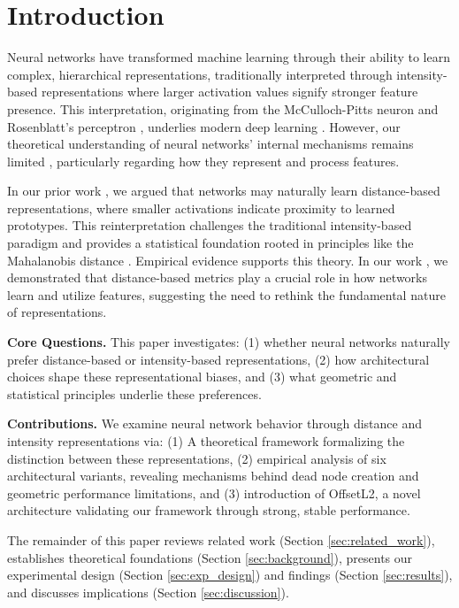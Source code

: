 \section{Introduction}
\label{sec:introduction}

Neural networks have transformed machine learning through their ability to learn complex, hierarchical representations, traditionally interpreted through intensity-based representations where larger activation values signify stronger feature presence. This interpretation, originating from the McCulloch-Pitts neuron \cite{mcculloch1943logical} and Rosenblatt's perceptron \cite{rosenblatt1958perceptron}, underlies modern deep learning \cite{lecun2015deep}. However, our theoretical understanding of neural networks' internal mechanisms remains limited \cite{lipton2018mythos, montavon2018methods}, particularly regarding how they represent and process features.

In our prior work \cite{oursland2024interpreting}, we argued that networks may naturally learn distance-based representations, where smaller activations indicate proximity to learned prototypes. This reinterpretation challenges the traditional intensity-based paradigm and provides a statistical foundation rooted in principles like the Mahalanobis distance \cite{mahalanobis1936generalized, mclachlan2019mahalanobis}. Empirical evidence supports this theory. In our work \cite{oursland2024neural}, we demonstrated that distance-based metrics play a crucial role in how networks learn and utilize features, suggesting the need to rethink the fundamental nature of representations.

\textbf{Core Questions.} This paper investigates: (1) whether neural networks naturally prefer distance-based or intensity-based representations, (2) how architectural choices shape these representational biases, and (3) what geometric and statistical principles underlie these preferences.

\textbf{Contributions.} We examine neural network behavior through distance and intensity representations via: (1) A theoretical framework formalizing the distinction between these representations, (2) empirical analysis of six architectural variants, revealing mechanisms behind dead node creation and geometric performance limitations, and (3) introduction of OffsetL2, a novel architecture validating our framework through strong, stable performance.

The remainder of this paper reviews related work (Section \ref{sec:related_work}), establishes theoretical foundations (Section \ref{sec:background}), presents our experimental design (Section \ref{sec:exp_design}) and findings (Section \ref{sec:results}), and discusses implications (Section \ref{sec:discussion}).